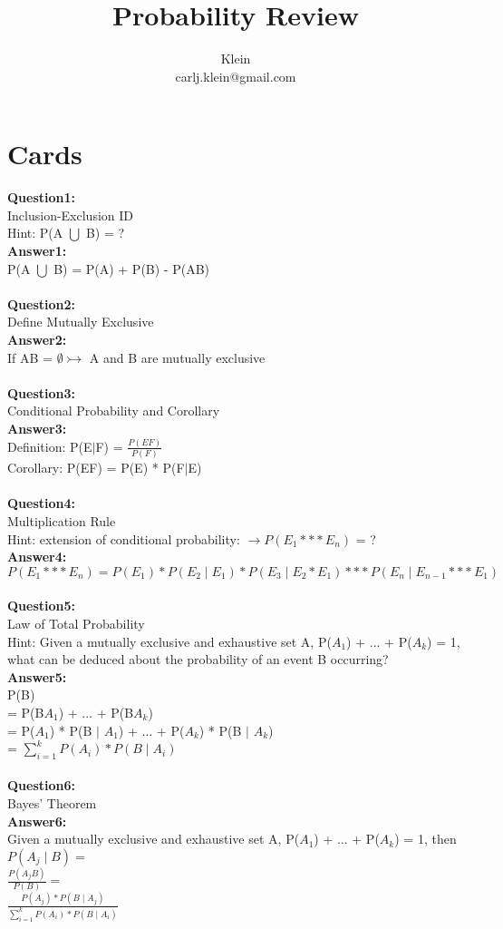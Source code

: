 \documentclass{article}
\begin{document}
	\title{Probability Review}
	\author{Klein \\ carlj.klein@gmail.com}
	\date{}
	\maketitle


\section{Cards}
\textbf{Question1:} \\
Inclusion-Exclusion ID
\\
Hint: P(A $\bigcup$ B) = ?
\\
\textbf{Answer1:} \\
P(A $\bigcup$ B) = P(A) + P(B) - P(AB)
\\\\


\textbf{Question2:} \\
Define Mutually Exclusive
\\
\textbf{Answer2:} \\
If AB = $\emptyset \rightarrowtail$ A and B are mutually exclusive 
\\\\

\textbf{Question3:} \\
Conditional Probability and Corollary
\\
\textbf{Answer3:} \\
Definition: P(E$\mid$F) = $\frac{P(EF)}{P(F)}$ 
\\
Corollary: P(EF) = P(E) * P(F$\mid$E)
\\\\


\textbf{Question4:} \\
Multiplication Rule
\\
Hint: extension of conditional probability: $\rightarrow P(E_1 *** E_n)$ = ?
\\
\textbf{Answer4:} \\
$P(E_1 *** E_n) = P(E_1) * P(E_2\mid E_1) * P(E_3\mid E_2 * E_1) *** P(E_n\mid E_{n-1} *** E_1)$
\\\\


\textbf{Question5:} \\
Law of Total Probability
\\
Hint: Given a mutually exclusive and exhaustive set A, P($A_1$) + ... + P($A_k$) = 1, what can be deduced about the probability of an event B occurring?
\\
\textbf{Answer5:} \\
P(B)\\
= P(B$A_1$) + ... + P(B$A_k$)\\
= P($A_1$) * P(B $\mid$ $A_1$) + ... + P($A_k$) * P(B $\mid$ $A_k$)\\
= $\sum_{i=1}^k P(A_i) * P(B \mid A_i)$
\\\\


\textbf{Question6:} \\
Bayes' Theorem 
\\
\textbf{Answer6:} \\
Given a mutually exclusive and exhaustive set A, P($A_1$) + ... + P($A_k$) = 1, then\\
$P(A_j \mid B) = $\\
$\frac{P(A_jB)}{P(B)} = $\\
$\frac{P(A_j) * P(B \mid A_j)}{\sum_{i=1}^k P(A_i) * P(B \mid A_i)}$
\end{document}
